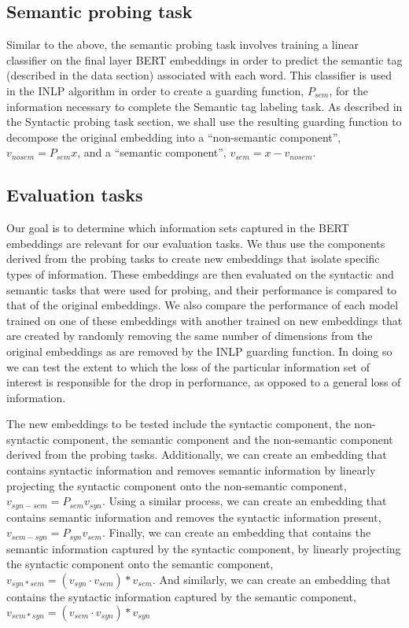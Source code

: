 \documentclass[11pt,a4paper]{article}
\begin{document}
\subsection{Semantic probing task}
\label{sec:semantics}

Similar to the above, the semantic probing task involves training a linear classifier on the final layer BERT embeddings in order to predict the semantic tag (described in the data section) associated with each word. This classifier is used in the INLP algorithm in order to create a guarding function, $P_{sem}$, for the information necessary to complete the Semantic tag labeling task. As described in the Syntactic probing task section, we shall use the resulting guarding function to decompose the original embedding into a ``non-semantic component'', $v_{no sem} = P_{sem} x$, and a ``semantic component'', $v_{sem} = x - v_{no sem}$. 


\subsection{Evaluation tasks}
\label{sec:eval}

Our goal is to determine which information sets captured in the BERT embeddings are relevant for our evaluation tasks. We thus use the components derived from the probing tasks to create new embeddings that isolate specific types of information. These embeddings are then evaluated on the syntactic and semantic tasks that were used for probing, and their performance is compared to that of the original embeddings. We also compare the performance of each model trained on one of these embeddings with another trained on new embeddings that are created by randomly removing the same number of dimensions from the original embeddings as are removed by the INLP guarding function. In doing so we can test the extent to which the loss of the particular information set of interest is responsible for the drop in performance, as opposed to a general loss of information. 

The new embeddings to be tested include the syntactic component, the non-syntactic component, the semantic component and the non-semantic component derived from the probing tasks. Additionally, we can create an embedding that contains syntactic information and removes semantic information by linearly projecting the syntactic component onto the non-semantic component, $v_{syn - sem} = P_{sem} v_{syn}$. Using a similar process, we can create an embedding that contains semantic information and removes the syntactic information present, $v_{sem - syn} = P_{syn} v_{sem}$. Finally, we can create an embedding that contains the semantic information captured by the syntactic component, by linearly projecting the syntactic component onto the semantic component, $v_{syn * sem} = (v_{syn} \cdot v_{sem}) * v_{sem}$. And similarly, we can create an embedding that contains the syntactic information captured by the semantic component, $v_{sem * syn} = (v_{sem} \cdot v_{syn}) * v_{syn}$
\end{document}
